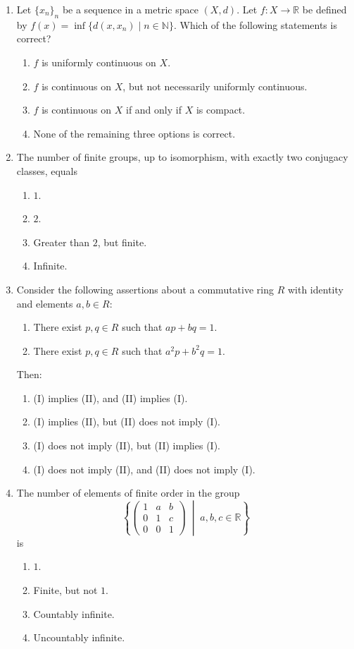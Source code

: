 \documentclass[11pt, a4paper]{article}
\begin{document}
\begin{enumerate}
  \item Let $\{x_n\}_n$ be a sequence in a metric space $(X, d)$. Let $f: X \to \mathbb{R}$ be defined by $f(x) = \inf\{d(x, x_n) \mid n \in \mathbb{N}\}$. Which of the following statements is correct?
  \begin{enumerate}[label=(\alph*)]
    \item $f$ is uniformly continuous on $X$.
    \item $f$ is continuous on $X$, but not necessarily uniformly continuous.
    \item $f$ is continuous on $X$ if and only if $X$ is compact.
    \item None of the remaining three options is correct.
  \end{enumerate}

  \item The number of finite groups, up to isomorphism, with exactly two conjugacy classes, equals
  \begin{enumerate}[label=(\alph*)]
    \item $1$.
    \item $2$.
    \item Greater than $2$, but finite.
    \item Infinite.
  \end{enumerate}

  \item Consider the following assertions about a commutative ring $R$ with identity and elements $a, b \in R$:
  \begin{enumerate}[label=(\Roman*)]
    \item There exist $p, q \in R$ such that $ap + bq = 1$.
    \item There exist $p, q \in R$ such that $a^2 p + b^2 q = 1$.
  \end{enumerate}
  Then:
  \begin{enumerate}[label=(\alph*)]
    \item (I) implies (II), and (II) implies (I).
    \item (I) implies (II), but (II) does not imply (I).
    \item (I) does not imply (II), but (II) implies (I).
    \item (I) does not imply (II), and (II) does not imply (I).
  \end{enumerate}

  \item The number of elements of finite order in the group
  \[
    \left\{ \begin{pmatrix} 1 & a & b \\ 0 & 1 & c \\ 0 & 0 & 1 \end{pmatrix} \;\middle|\; a, b, c \in \mathbb{R} \right\}
  \]
  is
  \begin{enumerate}[label=(\alph*)]
    \item $1$.
    \item Finite, but not $1$.
    \item Countably infinite.
    \item Uncountably infinite.
  \end{enumerate}


\end{enumerate}
\end{document}

